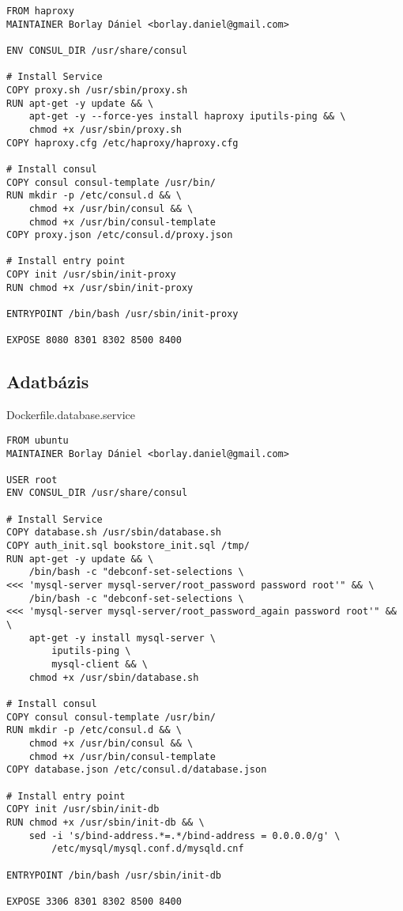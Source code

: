 \begin{verbatim}
FROM haproxy
MAINTAINER Borlay Dániel <borlay.daniel@gmail.com>

ENV CONSUL_DIR /usr/share/consul

# Install Service
COPY proxy.sh /usr/sbin/proxy.sh
RUN apt-get -y update && \
    apt-get -y --force-yes install haproxy iputils-ping && \
    chmod +x /usr/sbin/proxy.sh
COPY haproxy.cfg /etc/haproxy/haproxy.cfg

# Install consul
COPY consul consul-template /usr/bin/
RUN mkdir -p /etc/consul.d && \
    chmod +x /usr/bin/consul && \
    chmod +x /usr/bin/consul-template
COPY proxy.json /etc/consul.d/proxy.json

# Install entry point
COPY init /usr/sbin/init-proxy
RUN chmod +x /usr/sbin/init-proxy

ENTRYPOINT /bin/bash /usr/sbin/init-proxy

EXPOSE 8080 8301 8302 8500 8400
\end{verbatim}

\subsection{Adatbázis}\label{adatbuxe1zis}

Dockerfile.database.service

\begin{verbatim}
FROM ubuntu
MAINTAINER Borlay Dániel <borlay.daniel@gmail.com>

USER root
ENV CONSUL_DIR /usr/share/consul

# Install Service
COPY database.sh /usr/sbin/database.sh
COPY auth_init.sql bookstore_init.sql /tmp/
RUN apt-get -y update && \
    /bin/bash -c "debconf-set-selections \
<<< 'mysql-server mysql-server/root_password password root'" && \
    /bin/bash -c "debconf-set-selections \
<<< 'mysql-server mysql-server/root_password_again password root'" && \
    apt-get -y install mysql-server \
        iputils-ping \
        mysql-client && \
    chmod +x /usr/sbin/database.sh

# Install consul
COPY consul consul-template /usr/bin/
RUN mkdir -p /etc/consul.d && \
    chmod +x /usr/bin/consul && \
    chmod +x /usr/bin/consul-template
COPY database.json /etc/consul.d/database.json

# Install entry point
COPY init /usr/sbin/init-db
RUN chmod +x /usr/sbin/init-db && \
    sed -i 's/bind-address.*=.*/bind-address = 0.0.0.0/g' \
        /etc/mysql/mysql.conf.d/mysqld.cnf

ENTRYPOINT /bin/bash /usr/sbin/init-db

EXPOSE 3306 8301 8302 8500 8400
\end{verbatim}

